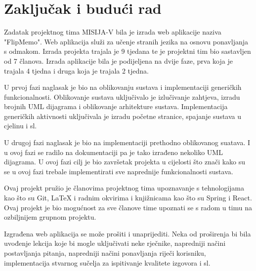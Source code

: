 \chapter{Zaključak i budući rad}
		
		
		
		 
		 Zadatak projektnog tima MISIJA-V bila je izrada web aplikacije naziva "FlipMemo". Web aplikacija služi za učenje stranih jezika na osnovu ponavljanja s odmakom. Izrada projekta trajala je 9 tjedana te je projektni tim bio sastavljen od 7 članova. Izrada aplikacije bila je podijeljena na dvije faze, prva koja je trajala 4 tjedna i druga koja je trajala 2 tjedna.
		 
		 U prvoj fazi naglasak je bio na oblikovanju sustava i implementaciji generičkih funkcionalnosti. Oblikovanje sustava uključivalo je izlučivanje zahtjeva, izradu brojnih UML dijagrama i oblikovanje arhitekture sustava. Implementacija generičkih aktivnosti uključivala je izradu početne stranice, spajanje sustava u cjelinu i sl.
		 
		 U drugoj fazi naglasak je bio na implementaciji prethodno oblikovanog suatava. I u ovoj fazi se radilo na dokumentaciji pa je tako izrađeno nekoliko UML dijagrama. U ovoj fazi cilj je bio završetak projekta u cijelosti što znači kako su se u ovoj fazi trebale implementirati sve naprednije funkcionalnosti sustava.
		 
		 Ovaj projekt pružio je članovima projektnog tima upoznavanje s tehnologijama kao što su Git, LaTeX i radnim okvirima i knjižnicama kao što su Spring i React. Ovaj projekt je bio mogućnost za sve članove time upoznati se s radom u timu na ozbiljnijem grupnom projektu.
		 
		 Izgrađena web aplikacija se može prošiti i unaprijediti. Neka od proširenja bi bila uvođenje lekcija koje bi mogle uključivati neke rječnike, napredniji načini postavljanja pitanja, napredniji načini ponavljanja riječi korisniku, implementacija stvarnog sučelja za ispitivanje kvalitete izgovora i sl.
		
		\eject 